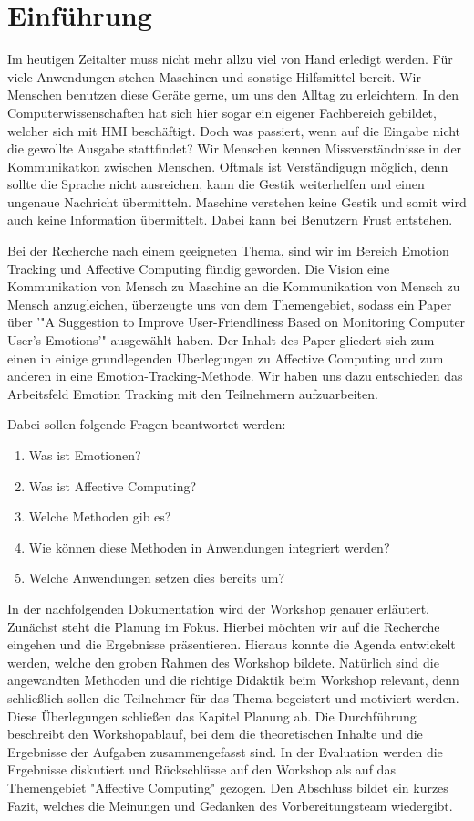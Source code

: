 \section{Einführung}

Im heutigen Zeitalter muss nicht mehr allzu viel von Hand erledigt werden. Für viele Anwendungen stehen Maschinen und sonstige Hilfsmittel bereit. Wir Menschen benutzen diese Geräte gerne, um uns den Alltag zu erleichtern. In den Computerwissenschaften hat sich hier sogar ein eigener Fachbereich gebildet, welcher sich mit HMI beschäftigt. Doch was passiert, wenn auf die Eingabe nicht die gewollte Ausgabe stattfindet? Wir Menschen kennen Missverständnisse in der Kommunikatkon zwischen Menschen. Oftmals ist Verständigugn möglich, denn sollte die Sprache nicht ausreichen, kann die Gestik weiterhelfen und einen ungenaue Nachricht übermitteln. Maschine verstehen keine Gestik und somit wird auch keine Information übermittelt. Dabei kann bei Benutzern Frust entstehen. 


Bei der Recherche nach einem geeigneten Thema, sind wir im Bereich Emotion Tracking und Affective Computing fündig geworden. Die Vision eine Kommunikation von Mensch zu Maschine an die Kommunikation von Mensch zu Mensch anzugleichen, überzeugte uns von dem Themengebiet, sodass ein Paper über '"A Suggestion to Improve User-Friendliness Based on Monitoring Computer User’s Emotions'" ausgewählt haben. Der Inhalt des Paper gliedert sich zum einen in einige grundlegenden Überlegungen zu Affective Computing und zum anderen in eine Emotion-Tracking-Methode. Wir haben uns dazu entschieden das Arbeitsfeld Emotion Tracking mit den Teilnehmern aufzuarbeiten.

Dabei sollen folgende Fragen beantwortet werden:

\begin{enumerate}
	\item Was ist Emotionen?
	\item Was ist Affective Computing?
	\item Welche Methoden gib es?
	\item Wie können diese Methoden in Anwendungen integriert werden?
	\item Welche Anwendungen setzen dies bereits um?
\end{enumerate}

In der nachfolgenden Dokumentation wird der Workshop genauer erläutert. Zunächst steht die Planung im Fokus. Hierbei möchten wir auf die Recherche eingehen und die Ergebnisse präsentieren. Hieraus konnte die Agenda entwickelt werden, welche den groben Rahmen des Workshop bildete. Natürlich sind die angewandten Methoden und die richtige Didaktik beim Workshop relevant, denn schließlich sollen die Teilnehmer für das Thema begeistert und motiviert werden.
Diese Überlegungen schließen das Kapitel Planung ab. Die Durchführung beschreibt den Workshopablauf, bei dem die theoretischen Inhalte und die Ergebnisse der Aufgaben zusammengefasst sind. In der Evaluation werden die Ergebnisse diskutiert und Rückschlüsse auf den Workshop als auf das Themengebiet "Affective Computing" gezogen. Den Abschluss bildet ein kurzes Fazit, welches die Meinungen und Gedanken des Vorbereitungsteam wiedergibt. 
